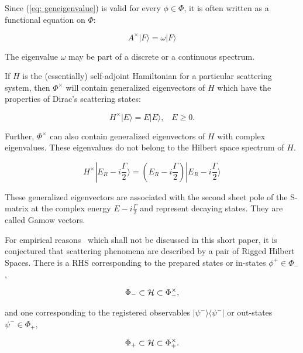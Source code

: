 \documentclass[12pt]{article}
\begin{document}
\noindent Since (\ref{eq: geneigenvalue}) is valid for every $\phi \in \Phi$, it is often written as a functional equation on $\Phi$:

\begin{equation}
A^{\times}|F\rangle = \omega |F\rangle
\end{equation}

\noindent The eigenvalue $\omega$ may be part of a discrete or a continuous spectrum.

If $H$ is the (essentially) self-adjoint Hamiltonian for a particular scattering system, then $\Phi^{\times}$ will contain generalized eigenvectors of $H$ which have the properties of Dirac's scattering states:

\begin{equation}
H^{\times}|E\rangle = E|E\rangle, \,\,\,\,\, E \geq 0.
\end{equation}

\noindent Further, $\Phi^{\times}$ can also contain generalized eigenvectors of $H$ with complex eigenvalues.  These eigenvalues do not belong to the Hilbert space spectrum of $H$.

\begin{equation}
H^{\times}|E_R - i\frac{\Gamma}{2}\rangle = (E_R - i\frac{\Gamma}{2})|E_R - i\frac{\Gamma}{2}\rangle   \label{eq: complex.eigenvalue}
\end{equation}

\noindent These generalized eigenvectors are associated with the second sheet pole of the S-matrix at the complex energy $E-i\frac{\Gamma}{2}$ and represent decaying states.  They are called Gamow vectors.

For empirical reasons~\cite{Bohm.et.al} which shall not be discussed in this short paper, it is conjectured that scattering phenomena are described by a pair of Rigged Hilbert Spaces.  There is a RHS corresponding to the prepared states or in-states $\phi^+ \in \Phi_-$,

\begin{equation}
\Phi_- \subset {\cal H} \subset \Phi_-^{\times},  \label{eq: in.states}
\end{equation}

\noindent and one corresponding to the registered observables $|\psi^-\rangle\langle\psi^-|$ or out-states $\psi^- \in \Phi_+$,

\begin{equation}
\Phi_+ \subset {\cal H} \subset \Phi_+^{\times}.  \label{eq: out.observables}
\end{equation}
\end{document}
